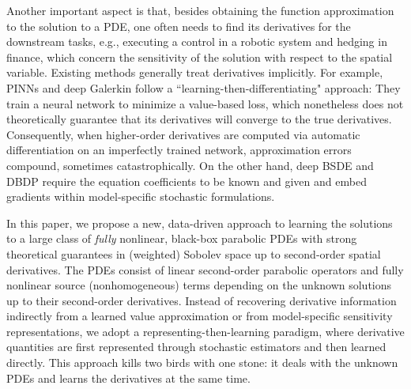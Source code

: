 \documentclass[twoside,11pt]{article}
\newcommand{\1}{\mathbf{1}}
\numberwithin{equation}{section}
\begin{document}
Another important aspect is that, besides obtaining the function approximation to the solution to a PDE, one often needs to find its derivatives for the downstream tasks, e.g., executing a control in a robotic system and hedging in finance, which concern the sensitivity of the solution  with respect to the spatial variable. Existing methods generally treat derivatives implicitly. For example, PINNs and deep Galerkin follow a ``learning-then-differentiating" approach:  They train a neural network to minimize a value-based loss, which nonetheless does not theoretically guarantee that its derivatives will converge to the true derivatives. Consequently, when higher-order derivatives are computed via automatic differentiation on an imperfectly trained network, approximation errors compound, sometimes  catastrophically.
On the other hand, deep BSDE and DBDP require the equation coefficients to be known and given and embed gradients  within model-specific stochastic formulations. 

In this paper, we propose a new, data-driven approach to learning the solutions to a large class of {\it fully} nonlinear, black-box parabolic PDEs with strong theoretical guarantees in (weighted) Sobolev space up to second-order spatial derivatives. The PDEs consist of linear second-order parabolic operators and fully nonlinear source (nonhomogeneous) terms depending on the unknown solutions up to their second-order derivatives. Instead of recovering derivative information indirectly from a learned value approximation or from model-specific sensitivity representations, we adopt a representing-then-learning paradigm, where derivative quantities are first represented through stochastic estimators and then learned directly. This approach kills two birds with one stone: it deals with the unknown PDEs and learns the derivatives at the same time. 
\end{document}
